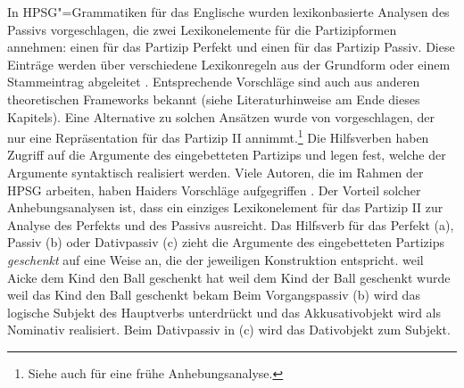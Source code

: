 In HPSG"=Grammatiken für das Englische wurden lexikonbasierte Analysen des Passivs vorgeschlagen,
die zwei Lexikonelemente für die Partizipformen annehmen: einen für das Partizip Perfekt und einen
für das Partizip Passiv. Diese Einträge werden über verschiedene Lexikonregeln aus der Grundform
oder einem Stammeintrag abgeleitet \parencites[--218]{ps}[Abschnitt~2.8]{MOe2013a}. Entsprechende Vorschläge sind auch aus anderen theoretischen Frameworks
bekannt (siehe Literaturhinweise am Ende dieses Kapitels). Eine Alternative zu solchen Ansätzen
wurde von \citet{Haider86} vorgeschlagen, der nur eine Repräsentation für das Partizip II annimmt.\footnote{
        Siehe auch  für eine frühe Anhebungsanalyse.%
}
Die Hilfsverben haben Zugriff auf die Argumente des eingebetteten Partizips und legen fest,
welche der Argumente syntaktisch realisiert werden. Viele Autoren, die im Rahmen der HPSG arbeiten,
haben Haiders Vorschläge aufgegriffen \citep{Kathol91a,Kathol94a,HM94a,Lebeth94,Pollard94a,Ryu97a,Mueller99a,Mueller2002g,MuellerGermanic,Gunkel2003b}.
Der Vorteil solcher Anhebungsanalysen ist, dass ein einziges Lexikonelement für das Partizip II zur Analyse
des Perfekts und des Passivs ausreicht. Das Hilfsverb für das Perfekt (a), 
Passiv (b) oder Dativpassiv (c) zieht die Argumente
des eingebetteten Partizips \emph{geschenkt} auf eine Weise an, die der jeweiligen Konstruktion
entspricht.
\eal
\label{bsp-kasus-geschenkt}
\ex weil Aicke dem Kind den Ball geschenkt hat
\ex weil dem Kind der Ball geschenkt wurde
\ex weil das Kind den Ball geschenkt bekam
\zl
Beim Vorgangspassiv (b) wird das logische Subjekt des Hauptverbs unterdrückt und das
Akkusativobjekt wird als Nominativ realisiert. Beim Dativpassiv in (c) wird das Dativobjekt
zum Subjekt.

